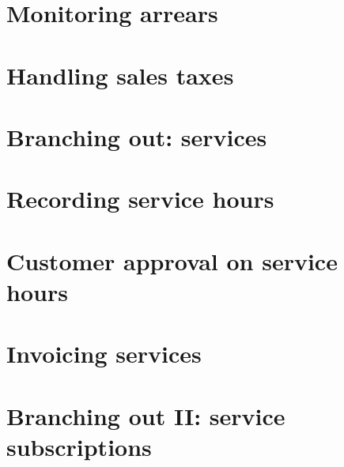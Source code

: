 


\chapter{Monitoring arrears}


\chapter{Handling sales taxes}



% 

\chapter{Branching out: services}



\chapter{Recording service hours}

\chapter{Customer approval on service hours}

\chapter{Invoicing services}

\chapter{Branching out II: service subscriptions}


